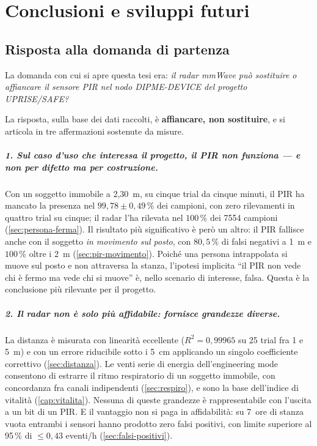 \chapter{Conclusioni e sviluppi futuri}
\label{cap:conclusioni}

\section{Risposta alla domanda di partenza}

La domanda con cui si apre questa tesi era: \emph{il radar mmWave può sostituire o
affiancare il sensore PIR nel nodo DIPME-DEVICE del progetto UPRISE/SAFE?}

La risposta, sulla base dei dati raccolti, è \textbf{affiancare, non sostituire}, e
si articola in tre affermazioni sostenute da misure.

\paragraph{1. Sul caso d'uso che interessa il progetto, il PIR non funziona --- e
non per difetto ma per costruzione.} Con un soggetto immobile a 2,30~m, su cinque
trial da cinque minuti, il PIR ha mancato la presenza nel
$99{,}78 \pm 0{,}49\,\%$ dei campioni, con zero rilevamenti in quattro trial su
cinque; il radar l'ha rilevata nel $100\,\%$ dei 7554 campioni
(\cref{sec:persona-ferma}). Il risultato più significativo è però un altro: il PIR
fallisce anche con il soggetto \emph{in movimento sul posto}, con
$80{,}5\,\%$ di falsi negativi a 1~m e $100\,\%$ oltre i 2~m
(\cref{sec:pir-movimento}). Poiché una persona intrappolata si muove sul posto e non
attraversa la stanza, l'ipotesi implicita ``il PIR non vede chi è fermo ma vede chi
si muove'' è, nello scenario di interesse, falsa. Questa è la conclusione più
rilevante per il progetto.

\paragraph{2. Il radar non è solo più affidabile: fornisce grandezze diverse.} La
distanza è misurata con linearità eccellente ($R^2 = 0{,}99965$ su 25 trial fra 1 e
5~m) e con un errore riducibile sotto i 5~cm applicando un singolo coefficiente
correttivo (\cref{sec:distanza}). Le venti serie di energia dell'engineering mode
consentono di estrarre il ritmo respiratorio di un soggetto immobile, con
concordanza fra canali indipendenti (\cref{sec:respiro}), e sono la base
dell'indice di vitalità (\cref{cap:vitalita}). Nessuna di queste grandezze è
rappresentabile con l'uscita a un bit di un PIR. E il vantaggio non si paga in
affidabilità: su 7~ore di stanza vuota entrambi i sensori hanno prodotto zero falsi
positivi, con limite superiore al 95\,\% di $\leq 0{,}43$ eventi/h
(\cref{sec:falsi-positivi}).

